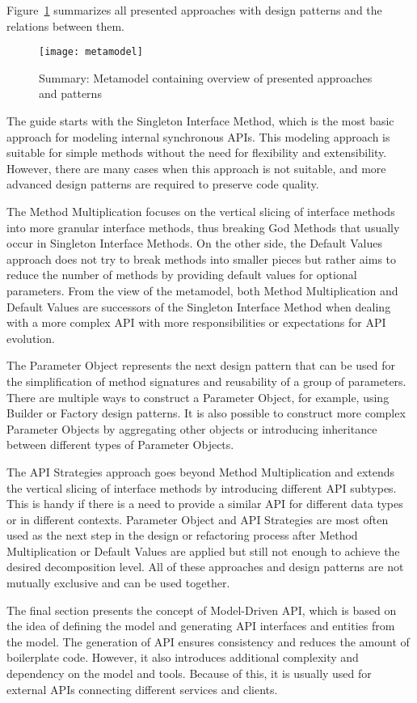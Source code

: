 Figure~\ref{fig:metamodel} summarizes all presented approaches with design patterns and the relations between them.

\begin{figure}[!htb]
    \centering
    \texttt{[image: metamodel]}
    \caption{Summary: Metamodel containing overview of presented approaches and patterns}
    \label{fig:metamodel}
\end{figure}

The guide starts with the Singleton Interface Method, which is the most basic approach for modeling internal
synchronous APIs.
This modeling approach is suitable for simple methods without the need for flexibility and extensibility.
However, there are many cases when this approach is not suitable, and more advanced design patterns are required
to preserve code quality.

The Method Multiplication focuses on the vertical slicing of interface methods into more granular interface methods,
thus breaking God Methods that usually occur in Singleton Interface Methods.
On the other side, the Default Values approach does not try to break methods into smaller pieces but rather aims
to reduce the number of methods by providing default values for optional parameters.
From the view of the metamodel, both Method Multiplication and Default Values are successors
of the Singleton Interface Method when dealing with a more complex API with more responsibilities
or expectations for API evolution.

The Parameter Object represents the next design pattern that can be used for the simplification of method signatures
and reusability of a group of parameters.
There are multiple ways to construct a Parameter Object, for example, using Builder or Factory design patterns.
It is also possible to construct more complex Parameter Objects by aggregating other objects
or introducing inheritance between different types of Parameter Objects.

The API Strategies approach goes beyond Method Multiplication and extends the vertical slicing of interface methods
by introducing different API subtypes.
This is handy if there is a need to provide a similar API for different data types or in different contexts.
Parameter Object and API Strategies are most often used as the next step in the design or refactoring process
after Method Multiplication or Default Values are applied but still not enough to achieve
the desired decomposition level.
All of these approaches and design patterns are not mutually exclusive and can be used together.

The final section presents the concept of Model-Driven API, which is based on the idea of defining the model
and generating API interfaces and entities from the model.
The generation of API ensures consistency and reduces the amount of boilerplate code.
However, it also introduces additional complexity and dependency on the model and tools.
Because of this, it is usually used for external APIs connecting different services and clients.
